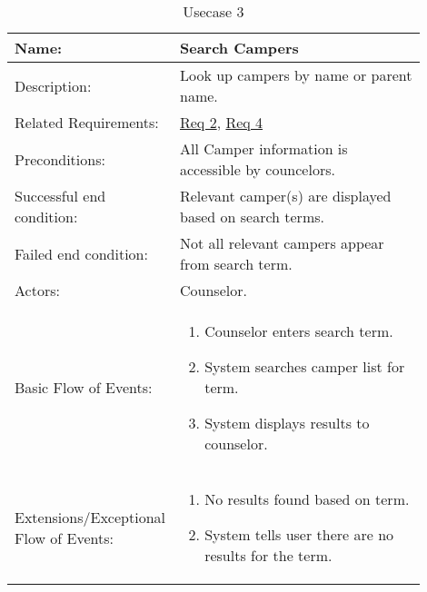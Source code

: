 \documentclass[11pt]{article}
\begin{document}
\begin{table}[!htb]
\caption{Usecase 3}
\label{des:search campers}
\begin{center}
\begin{tabular}{p{0.30\linewidth}p{0.60\linewidth}}
	Name: & Search Campers \\\hline
	Description: & Look up campers by name or parent name. \\\hline
	Related Requirements:& \hyperlink{Req2}{Req 2}, \hyperlink{Req4}{Req 4}\\\hline
	Preconditions:& All Camper information is accessible by councelors.\\\hline
	Successful end condition:& Relevant camper(s) are displayed based on search terms.\\\hline
	Failed end condition:& Not all relevant campers appear from search term.\\\hline
	Actors:& Counselor.\\\hline
	Basic Flow of Events: & \begin{enumerate}[topsep=0pt]
		\item Counselor enters search term.
		\item System searches camper list for term.
		\item System displays results to counselor.
	\end{enumerate}\\\hline
	Extensions/Exceptional Flow of Events: & \begin{enumerate}[topsep=0pt]
		\item No results found based on term.
		\item System tells user there are no results for the term.	
	\end{enumerate}
\end{tabular}
\end{center}
\end{table}
\end{document}
